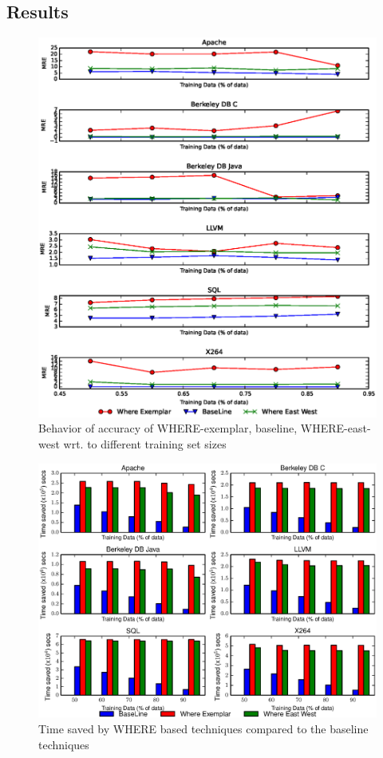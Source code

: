 \documentclass{sig-alternative}
\begin{document}
\subsection{Results}
\begin{figure}[!t]
\includegraphics[width=0.9\linewidth, height= 0.7\textheight]{Figures/SamplingAccuracy.eps}
\caption{Behavior of accuracy of WHERE-exemplar, baseline, WHERE-east-west wrt. to different training set sizes }\label{fig:sampling_accuracy}
\end{figure}

\begin{figure}[!t]
\includegraphics[width=0.9\linewidth]{Figures/performance_graph.eps}
\caption{Time saved by WHERE based techniques compared to the baseline techniques }\label{fig:performance_graph}
\end{figure}
\end{document}
